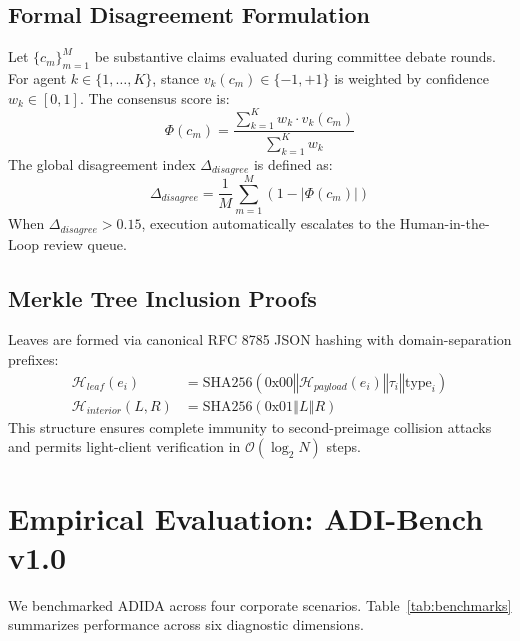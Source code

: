 \documentclass[10pt,journal,compsoc]{IEEEtran}
\begin{document}
\subsection{Formal Disagreement Formulation}
Let $\{c_m\}_{m=1}^M$ be substantive claims evaluated during committee debate rounds. For agent $k \in \{1, \dots, K\}$, stance $v_k(c_m) \in \{-1, +1\}$ is weighted by confidence $w_k \in [0, 1]$. The consensus score is:
\begin{equation}
\Phi(c_m) = \frac{\sum_{k=1}^K w_k \cdot v_k(c_m)}{\sum_{k=1}^K w_k}
\end{equation}
The global disagreement index $\Delta_{disagree}$ is defined as:
\begin{equation}
\Delta_{disagree} = \frac{1}{M} \sum_{m=1}^M \left( 1 - |\Phi(c_m)| \right)
\end{equation}
When $\Delta_{disagree} > 0.15$, execution automatically escalates to the Human-in-the-Loop review queue.

\subsection{Merkle Tree Inclusion Proofs}
Leaves are formed via canonical RFC 8785 JSON hashing with domain-separation prefixes:
\begin{align}
\mathcal{H}_{leaf}(e_i) &= \text{SHA256}(0\text{x}00 \mathbin{\Vert} \mathcal{H}_{payload}(e_i) \mathbin{\Vert} \tau_i \mathbin{\Vert} \text{type}_i) \\
\mathcal{H}_{interior}(L, R) &= \text{SHA256}(0\text{x}01 \mathbin{\Vert} L \mathbin{\Vert} R)
\end{align}
This structure ensures complete immunity to second-preimage collision attacks and permits light-client verification in $\mathcal{O}(\log_2 N)$ steps.

\section{Empirical Evaluation: ADI-Bench v1.0}
We benchmarked ADIDA across four corporate scenarios. Table~\ref{tab:benchmarks} summarizes performance across six diagnostic dimensions.
\end{document}
